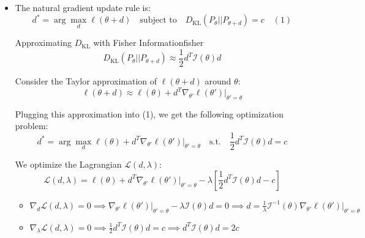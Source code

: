 \begin{solution}
    \begin{itemize}

        \item[(a)] The natural gradient update rule is:
              \[
                  d^* = \arg\max_d \ell(\theta + d) \quad \text{subject to} \quad D_{\text{KL}}(P_\theta || P_{\theta+d}) = c \quad (1)
              \]

              \begin{lemma}{Approximating $D_{\text{KL}}$ with Fisher Information}{fisher}
                  \[
                      D_{\text{KL}}(P_\theta || P_{\theta+d}) \approx \frac{1}{2} d^T \mathcal{I}(\theta) d
                  \]
              \end{lemma}

              Consider the Taylor approximation of $\ell(\theta + d)$ around $\theta$:
              \[
                  \ell(\theta + d) \approx \ell(\theta) + d^T \nabla_{\theta'} \ell(\theta') \Big|_{\theta'=\theta}
              \]

              Plugging this approximation into (1), we get the following optimization problem:
              \[
                  d^* = \arg\max_d \ell(\theta) + d^T \nabla_{\theta'} \ell(\theta') \Big|_{\theta'=\theta} \quad \text{s.t.} \quad \frac{1}{2} d^T \mathcal{I}(\theta) d = c
              \]

              We optimize the Lagrangian $\mathcal{L}(d, \lambda)$:
              \[
                  \mathcal{L}(d, \lambda) = \ell(\theta) + d^T \nabla_{\theta'} \ell(\theta') \Big|_{\theta'=\theta} - \lambda \left[ \frac{1}{2} d^T \mathcal{I}(\theta) d - c \right]
              \]

              \begin{itemize}
                  \item $\nabla_d \mathcal{L}(d, \lambda) = 0 \implies \nabla_{\theta'} \ell(\theta') \Big|_{\theta'=\theta} - \lambda \mathcal{I}(\theta) d = 0 \implies d = \frac{1}{\lambda} \mathcal{I}^{-1}(\theta) \nabla_{\theta'} \ell(\theta') \Big|_{\theta'=\theta}$
                  \item $\nabla_\lambda \mathcal{L}(d, \lambda) = 0 \implies \frac{1}{2} d^T \mathcal{I}(\theta) d = c \implies d^T \mathcal{I}(\theta) d = 2c$
              \end{itemize}


\end{itemize}
\end{solution}
